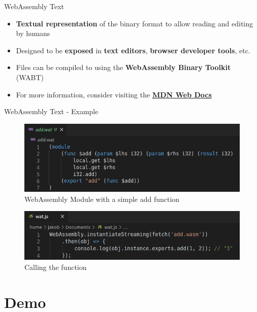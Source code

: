 \documentclass{beamer}
\begin{document}
\begin{frame}[fragile]{WebAssembly Text}
    \begin{itemize}
        \item \textbf{Textual representation} of the binary format to allow reading and editing by humans
        \item Designed to be \textbf{exposed} in \textbf{text editors}, \textbf{browser developer tools}, etc.
        \item Files can be compiled to using the \textbf{WebAssembly Binary Toolkit} (WABT)
        \item For more information, consider visiting the \textbf{\href{https://developer.mozilla.org/en-US/docs/WebAssembly/Understanding_the_text_format}{MDN Web Docs}}
    \end{itemize}
\end{frame}

\begin{frame}{WebAssembly Text - Example}
    \begin{figure}
        \includegraphics[scale=0.3]{./images/wat.png}
        \caption{WebAssembly Module with a simple add function}
    \end{figure}
    \begin{figure}
        \includegraphics[scale=0.3]{./images/watjs.png}
        \caption{Calling the function}
    \end{figure}
\end{frame}

\section{Demo}
\end{document}
